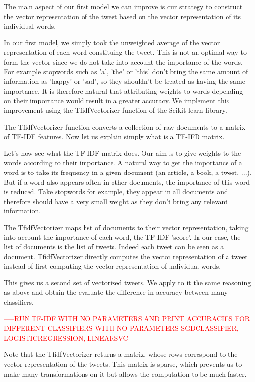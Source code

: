 \documentclass[10pt,conference,compsocconf]{IEEEtran}
\begin{document}
The main aspect of our first model we can improve is our strategy to construct the vector representation of the tweet based on the vector representation of its individual words.

In our first model, we simply took the unweighted average of the vector representation of each word constituing the tweet. This is not an optimal way to form the vector since we do not take into account the importance of the words. For example stopwords such as 'a', 'the' or 'this' don't bring the same amount of information as 'happy' or 'sad', so they shouldn't be treated as having the same importance. It is therefore natural that attributing weights to words depending on their importance would result in a greater accuracy. We implement this improvement using the TfidfVectorizer function of the Scikit learn library.

The TfidfVectorizer function converts a collection of raw documents to a matrix of TF-IDF features. Now let us explain simply what is a TF-IFD matrix.

Let's now see what the TF-IDF matrix does.
Our aim is to give weights to the words according to their importance. A natural way to get the importance of a word is to take its frequency in a given document (an article, a book, a tweet, ...). But if a word also appears often in other documents, the importance of this word is reduced. Take stopwords for example, they appear in all documents and therefore should have a very small weight as they don't bring any relevant information.

The TfidfVectorizer maps list of documents to their vector representation, taking into account the importance of each word, the TF-IDF 'score'. In our case, the list of documents is the list of tweets. Indeed each tweet can be seen as a document. TfidfVectorizer directly computes the vector representation of a tweet instead of first computing the vector representation of individual words.

This gives us a second set of vectorized tweets. We apply to it the same reasoning as above and obtain the evaluate the difference in accuracy between many classifiers. 

\begin{center}\textcolor{red}{-----RUN TF-IDF WITH NO PARAMETERS AND PRINT ACCURACIES FOR DIFFERENT CLASSIFIERS WITH NO PARAMETERS
SGDCLASSIFIER, LOGISTICREGRESSION, LINEARSVC-----}\end{center}

Note that the TfidfVectorizer returns a matrix, whose rows correspond to the vector representation of the tweets. This matrix is sparse, which prevents us to make many transformations on it but allows the computation to be much faster.
\end{document}
